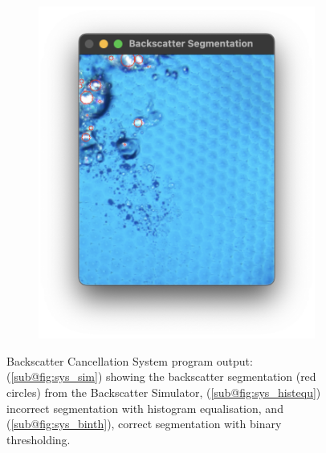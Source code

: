 \begin{figure}[H]
\begin{subfigure}{.25\textwidth}
        \caption{}
        \label{fig:sys_histequ}
    \end{subfigure}
    \hfill
    \begin{subfigure}{.25\textwidth}
        \centering
        \includegraphics[width=1\linewidth]{assets/sys_binth.png}
        \caption{}
        \label{fig:sys_binth}
    \end{subfigure}
    \caption{Backscatter Cancellation System program output: (\ref{sub@fig:sys_sim}) showing the backscatter segmentation (red circles) from the Backscatter Simulator, (\ref{sub@fig:sys_histequ}) incorrect segmentation with histogram equalisation, and (\ref{sub@fig:sys_binth}), correct segmentation with binary thresholding.}
    \label{fig:sys_validate}
\end{figure}

